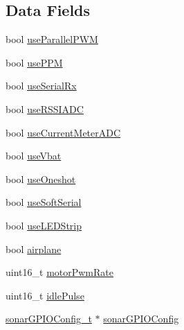 \subsection*{Data Fields}
\begin{DoxyCompactItemize}
\item 
bool \hyperlink{structdrv__pwm__config__s_a4eb66c27a2e8c69ffbdb46e2192e421f}{use\+Parallel\+P\+W\+M}
\item 
bool \hyperlink{structdrv__pwm__config__s_a2ee7f3ae5a9c3dcea7fe93ec93d63bde}{use\+P\+P\+M}
\item 
bool \hyperlink{structdrv__pwm__config__s_ae275b5bace3869325aea119a0bb7c0f5}{use\+Serial\+Rx}
\item 
bool \hyperlink{structdrv__pwm__config__s_a80a55298b045db8a058fdc8ef3c28ff9}{use\+R\+S\+S\+I\+A\+D\+C}
\item 
bool \hyperlink{structdrv__pwm__config__s_a1076f28f88400b80cfe0ebb0c36cda42}{use\+Current\+Meter\+A\+D\+C}
\item 
bool \hyperlink{structdrv__pwm__config__s_afefe64ea72b6455e705845dd10026b63}{use\+Vbat}
\item 
bool \hyperlink{structdrv__pwm__config__s_adb684afd5ef883d38efd6f8e893f8107}{use\+Oneshot}
\item 
bool \hyperlink{structdrv__pwm__config__s_ab6d60e3e33b7a9a5d2f3a33c6a7d7247}{use\+Soft\+Serial}
\item 
bool \hyperlink{structdrv__pwm__config__s_a722b81abc304efb2e205d9d44d1ae44f}{use\+L\+E\+D\+Strip}
\item 
bool \hyperlink{structdrv__pwm__config__s_a3aaa02b00537d99c8ee27527833347cc}{airplane}
\item 
uint16\+\_\+t \hyperlink{structdrv__pwm__config__s_a0d8114ffac3709b0f963cf7e6309ff91}{motor\+Pwm\+Rate}
\item 
uint16\+\_\+t \hyperlink{structdrv__pwm__config__s_ac65df8053bb4f4dddc8b6f006775643e}{idle\+Pulse}
\item 
\hyperlink{pwm__mapping_8h_ad2d92c28063c0ee9d39f40a326a419a4}{sonar\+G\+P\+I\+O\+Config\+\_\+t} $\ast$ \hyperlink{structdrv__pwm__config__s_ae71498b3489b6685bcad2e2ae07dde09}{sonar\+G\+P\+I\+O\+Config}
\end{DoxyCompactItemize}


